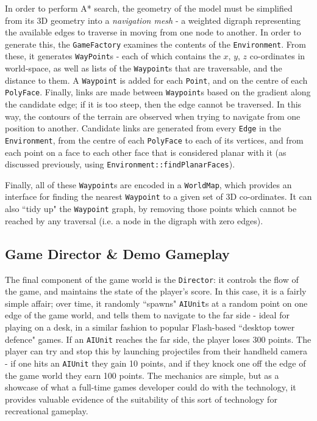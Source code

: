 \documentclass[a4paper,10pt]{article}
\begin{document}
In order to perform A* search, the geometry of the model must be simplified from its 3D geometry into a \textit{navigation mesh} - a weighted digraph representing the available edges to traverse in moving from one node to another. In order to generate this, the \texttt{GameFactory} examines the contents of the \texttt{Environment}. From these, it generates \texttt{WayPoint}s - each of which contains the $x$, $y$, $z$ co-ordinates in world-space, as well as lists of the \texttt{Waypoint}s that are traversable, and the distance to them. A \texttt{Waypoint} is added for each \texttt{Point}, and on the centre of each \texttt{PolyFace}. Finally, links are made between \texttt{Waypoint}s based on the gradient along the candidate edge; if it is too steep, then the edge cannot be traversed. In this way, the contours of the terrain are observed when trying to navigate from one position to another. Candidate links are generated from every \texttt{Edge} in the \texttt{Environment}, from the centre of each \texttt{PolyFace} to each of its vertices, and from each point on a face to each other face that is considered planar with it (as discussed previously, using \texttt{Environment::findPlanarFaces}).

Finally, all of these \texttt{Waypoint}s are encoded in a \texttt{WorldMap}, which provides an interface for finding the nearest \texttt{Waypoint} to a given set of 3D co-ordinates. It can also ``tidy up" the \texttt{Waypoint} graph, by removing those points which cannot be reached by any traversal (i.e. a node in the digraph with zero edges).

\subsection{Game Director \& Demo Gameplay}
The final component of the game world is the \texttt{Director}: it controls the flow of the game, and maintains the state of the player's score. In this case, it is a fairly simple affair; over time, it randomly ``spawns" \texttt{AIUnit}s at a random point on one edge of the game world, and tells them to navigate to the far side - ideal for playing on a desk, in a similar fashion to popular Flash-based ``desktop tower defence" games. If an \texttt{AIUnit} reaches the far side, the player loses 300 points. The player can try and stop this by launching projectiles from their handheld camera - if one hits an \texttt{AIUnit} they gain 10 points, and if they knock one off the edge of the game world they earn 100 points. The mechanics are simple, but as a showcase of what a full-time games developer could do with the technology, it provides valuable evidence of the suitability of this sort of technology for recreational gameplay.
\end{document}
